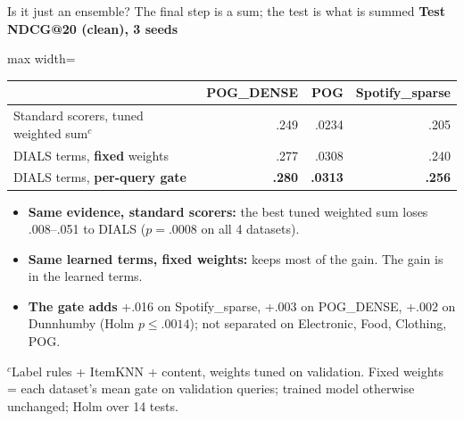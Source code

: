 \documentclass[10pt,aspectratio=169]{beamer}
\newcommand{\key}[1]{\textcolor{Accent}{\textbf{#1}}}
\newcommand{\fn}[1]{\textcolor{Muted}{\scriptsize #1}}
\begin{document}
\begin{frame}{Is it just an ensemble? The final step is a sum; the test is what is summed}
\textbf{Test NDCG@20 (clean), 3 seeds}\par\vspace{1mm}
\centering\renewcommand{\arraystretch}{1.2}
\begin{adjustbox}{max width=\textwidth}\begin{tabular}{lrrr}\toprule
& POG\_DENSE & POG & Spotify\_sparse\\\midrule
Standard scorers, tuned weighted sum$^c$ & .249 & .0234 & .205\\
DIALS terms, \key{fixed} weights & .277 & .0308 & .240\\
DIALS terms, \key{per-query gate} & \textbf{.280} & \textbf{.0313} & \textbf{.256}\\\bottomrule
\end{tabular}\end{adjustbox}\par
\raggedright\vspace{2mm}
\begin{itemize}\setlength\itemsep{1pt}\small
\item \key{Same evidence, standard scorers:} the best tuned weighted sum loses .008--.051 to DIALS ($p=.0008$ on all 4 datasets).
\item \key{Same learned terms, fixed weights:} keeps most of the gain. The gain is in the learned terms.
\item \key{The gate adds} +.016 on Spotify\_sparse, +.003 on POG\_DENSE, +.002 on Dunnhumby (Holm $p\le.0014$); not separated on Electronic, Food, Clothing, POG.
\end{itemize}
\fn{$^c$Label rules + ItemKNN + content, weights tuned on validation. Fixed weights = each dataset's mean gate on validation queries; trained model otherwise unchanged; Holm over 14 tests.}
\end{frame}
\end{document}
